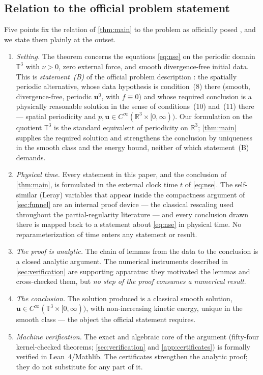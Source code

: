 \documentclass[11pt,letterpaper]{amsart}
\theoremstyle{definition}
\theoremstyle{remark}
\newcommand{\TT}{\mathbb{T}}
\newcommand{\RR}{\mathbb{R}}
\newcommand{\uu}{\boldsymbol{u}}
\begin{document}
\subsection{Relation to the official problem statement}\label{subsec:clay}
Five points fix the relation of \cref{thm:main} to the problem as officially posed
\cite{Fefferman2006}, and we state them plainly at the outset.

\begin{enumerate}[label=(\roman*),itemsep=2pt]
\item \emph{Setting.} The theorem concerns the equations \eqref{eq:nse} on the periodic
domain $\TT^3$ with $\nu>0$, zero external force, and smooth divergence-free initial
data. This is \emph{statement~(B)} of the official problem description
\cite{Fefferman2006}: the spatially periodic alternative, whose data hypothesis is
condition~(8) there (smooth, divergence-free, periodic $\uu^0$, with $f\equiv0$) and
whose required conclusion is a physically reasonable solution in the sense of
conditions~(10) and~(11) there --- spatial periodicity and
$p,\uu\in C^\infty(\RR^3\times[0,\infty))$. Our formulation on the quotient $\TT^3$
is the standard equivalent of periodicity on $\RR^3$; \cref{thm:main} supplies the
required solution and strengthens the conclusion by uniqueness in the smooth class and
the energy bound, neither of which statement~(B) demands.
\item \emph{Physical time.} Every statement in this paper, and the conclusion of
\cref{thm:main}, is formulated in the external clock time $t$ of \eqref{eq:nse}. The
self-similar (Leray) variables that appear inside the compactness argument of
\cref{sec:funnel} are an internal proof device --- the classical rescaling used
throughout the partial-regularity literature \cite{CKN1982,NRS1996,Tsai1998} --- and
every conclusion drawn there is mapped back to a statement about \eqref{eq:nse} in
physical time. No reparameterization of time enters any statement or result.
\item \emph{The proof is analytic.} The chain of lemmas from the data to the conclusion
is a closed analytic argument. The numerical instruments described in
\cref{sec:verification} are supporting apparatus: they motivated the lemmas and
cross-checked them, but \emph{no step of the proof consumes a numerical result}.
\item \emph{The conclusion.} The solution produced is a classical smooth solution,
$\uu\in C^\infty(\TT^3\times[0,\infty))$, with non-increasing kinetic energy, unique in
the smooth class --- the object the official statement requires.
\item \emph{Machine verification.} The exact and algebraic core of the argument
(fifty-four kernel-checked theorems; \cref{sec:verification} and
\cref{app:certificates}) is formally verified in Lean~4/Mathlib. The certificates
strengthen the analytic proof; they do not substitute for any part of it.
\end{enumerate}
\end{document}

